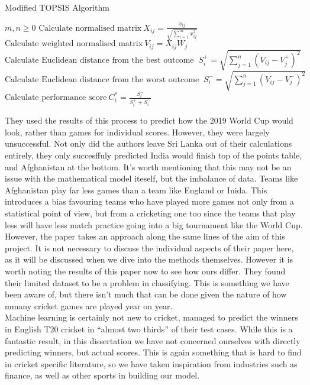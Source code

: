 \begin{algorithm}[h]
\caption{Modified TOPSIS Algorithm}\label{TOPSIS}
\begin{algorithmic}[1]
    \Require $m,n \geq 0$
    \State $\text{Calculate normalised matrix} \ X_{ij} = \frac{x_{ij}}{\sqrt{\sum_{i=1}^mx_{ij}^2}}$
    \State $\text{Calculate weighted normalised matrix} \ V_{ij}=X_{ij}W_j$
        \State $\text{Calculate Euclidean distance from the best outcome } \ S_i^+ = \sqrt{\sum_{j=1}^n(V_{ij}-V_j^+)^2} \ $
        \State $\text{Calculate Euclidean distance from the worst outcome } \ S_i^- = \sqrt{\sum_{j=1}^n(V_{ij}-V_j^-)^2} \ $
    \EndFor
    \State $\text{Calculate performance score} \ C_i^* = \frac{S_i^-}{S_i^+  + S_i^-}$
\end{algorithmic}
\end{algorithm}

They used the results of this process to predict how the 2019 World Cup would look, rather than games for individual scores. However, they were largely unsuccessful. 
Not only did the authors leave Sri Lanka out of their calculations entirely, they only succesffuly predicted India would finish top of the points table, and Afghanistan 
at the bottom. It's worth mentioning that this may not be an issue with the mathematical model iteself, but the imbalance of data. Teams like Afghanistan play far less games 
than a team like England or Inida. This introduces a bias favouring teams who have played more games not only from a statistical point of view, but from a cricketing one too 
since the teams that play less will have less match practice going into a big tournament like the World Cup. \\

However, the paper \cite{kumar} takes an approach along the same lines of the aim of this project. It is not necessary to discuss the individual aspects
of their paper here, as it will be discussed when we dive into the methods themselves. However it is worth noting the results of this paper now to see how
ours differ. They found their limited dataset to be a problem in classifying. This is something we have been aware of, but there isn't much that can be done
given the nature of how mmany cricket games are played year on year. \\

Machine learning is certainly not new to cricket, \cite{kampakis} managed to predict the winners in English T20 cricket in ``almost two thirds'' of their test cases. While this 
is a fantastic result, in this dissertation we have not concerned ourselves with directly predicting winners, but actual scores. This is again something that is hard to find 
in cricket specific literature, so we have taken inspiration from industries such as finance, as well as other sports in building our model. 